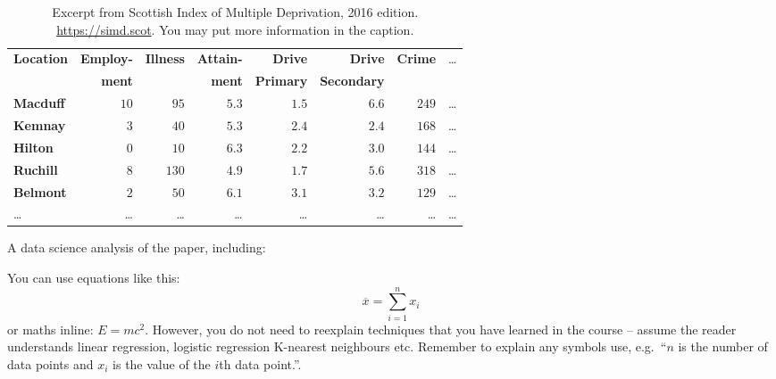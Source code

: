 \begin{table}[b]
  \centering
  \caption{Excerpt from Scottish Index of Multiple Deprivation, 2016 edition.
    \url{https://simd.scot}. You may put more information in the caption.}
  \label{tab:example1}
\begin{tabular}{lrrrrrrr}
\hline\hline
\textbf{Location}&\textbf{Employ-}&\textbf{Illness}&\textbf{Attain-}&\textbf{Drive}  &\textbf{Drive}    &\textbf{Crime}&\dots\\
                 &\textbf{ment}   &                &\textbf{ment}   &\textbf{Primary}&\textbf{Secondary}&              &\\
\hline
\textbf{Macduff}&$10$&$ 95$&$5.3$&$1.5$&$6.6$&$249$&\dots\tabularnewline
\textbf{Kemnay}&$ 3$&$ 40$&$5.3$&$2.4$&$2.4$&$168$&\dots\tabularnewline
\textbf{Hilton}&$ 0$&$ 10$&$6.3$&$2.2$&$3.0$&$144$&\dots\tabularnewline
\textbf{Ruchill}&$ 8$&$130$&$4.9$&$1.7$&$5.6$&$318$&\dots\tabularnewline
\textbf{Belmont}&$ 2$&$ 50$&$6.1$&$3.1$&$3.2$&$129$&\dots\tabularnewline
\dots&\dots&\dots&\dots&\dots&\dots&\dots&\dots\tabularnewline
\hline
\end{tabular}
\end{table}



A data science analysis of the paper, including: 


You can use equations like this:
\begin{equation}
  \label{fds-project-template:eq:1}
  \overline{x} = \sum_{i=1}^n x_i
\end{equation}
or maths inline: $E=mc^2$. However, you do not need to reexplain techniques that you have learned in the course -- assume the reader understands linear regression, logistic regression K-nearest neighbours etc.  Remember to explain any symbols use, e.g.~``$n$ is the number of data points and $x_i$ is the value of the $i$th data point.''.